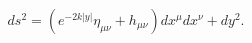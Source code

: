 \begin{equation}
\label{linearized}
ds^2 = (e^{-2 k |y|} \eta_{\mu \nu} + h_{\mu \nu}) dx^{\mu} dx^{\nu} + dy^2.
\end{equation}

